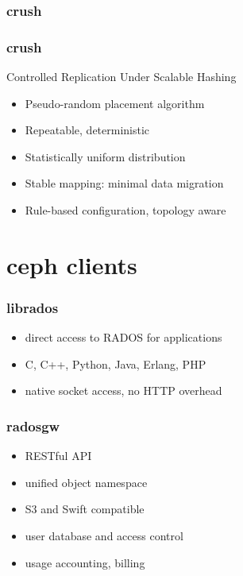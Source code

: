 \documentclass[10pt, compress]{beamer}
\begin{document}
\begin{frame}[fragile]
    \frametitle{crush}
    \begin{center}
        
    \end{center}
\end{frame}

\begin{frame}[fragile]
    \frametitle{crush}
    \begin{block}{\alert{C}ontrolled \alert{R}eplication \alert{U}nder 
        \alert{S}calable \alert{H}ashing}
    \begin{itemize}
        \item Pseudo-random placement algorithm
        \item Repeatable, deterministic
        \item Statistically uniform distribution
        \item Stable mapping: minimal data migration
        \item Rule-based configuration, topology aware
    \end{itemize}
\end{block}
\end{frame}

\section{ceph clients}
\begin{frame}[fragile]
    \frametitle{librados}
    \begin{itemize}
        \item direct access to RADOS for applications
        \item C, C++, Python, Java, Erlang, PHP
        \item native socket access, no HTTP overhead
    \end{itemize}
\end{frame}

\begin{frame}[fragile]
    \frametitle{radosgw}
    \begin{itemize}
        \item RESTful API
        \item unified object namespace
        \item S3 and Swift compatible
        \item user database and access control
        \item usage accounting, billing
    \end{itemize}
\end{frame}
\end{document}
